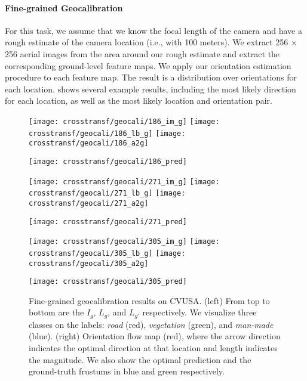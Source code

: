 \paragraph{Fine-grained Geocalibration}

For this task, we assume that we know the focal length of the camera
and have a rough estimate of the camera location (i.e., with 100
meters).  We extract 256 $\times$ 256 aerial images from the area
around our rough estimate and extract the corresponding ground-level
feature maps.  We apply our orientation estimation procedure to each
feature map.  The result is a distribution over orientations for each
location.   shows several example results,
including the most likely direction for each location, as well as the
most likely location and orientation pair.

\begin{figure*}
  \setlength{\aheight}{93pt}
  \setlength{\gwidth}{60.65pt}
  \centering
  \begin{minipage}[b]{\gwidth}
  \texttt{[image: crosstransf/geocali/186\_im\_g]}
  \texttt{[image: crosstransf/geocali/186\_lb\_g]}
  \texttt{[image: crosstransf/geocali/186\_a2g]}
  \end{minipage}
  \texttt{[image: crosstransf/geocali/186\_pred]}
  \hfill
  \begin{minipage}[b]{\gwidth}
  \texttt{[image: crosstransf/geocali/271\_im\_g]}
  \texttt{[image: crosstransf/geocali/271\_lb\_g]}
  \texttt{[image: crosstransf/geocali/271\_a2g]}
  \end{minipage}
  \texttt{[image: crosstransf/geocali/271\_pred]}
  \hfill
  \begin{minipage}[b]{\gwidth}
  \texttt{[image: crosstransf/geocali/305\_im\_g]}
  \texttt{[image: crosstransf/geocali/305\_lb\_g]}
  \texttt{[image: crosstransf/geocali/305\_a2g]}
  \end{minipage}
  \texttt{[image: crosstransf/geocali/305\_pred]}
  \hfill

  \caption{Fine-grained geocalibration results on CVUSA. (left) From
top to bottom are the $I_g$, $L_g$, and $L_{g'}$ respectively.  We
visualize three classes on the labels: {\em road} (red), {\em
vegetation} (green), and {\em man-made} (blue).  (right) Orientation
flow map (red), where the arrow direction indicates the optimal
direction at that location and length indicates the magnitude. We also
show the optimal prediction and the ground-truth frustums in blue and
green respectively.}
  \label{fig:geocali:cali}
\end{figure*}

